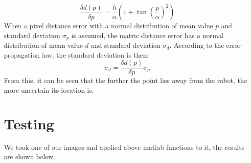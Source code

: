 \documentclass[12pt]{article}
\begin{document}
\begin{equation}
\frac{\delta d(p)}{\delta p} = \frac{h}{\alpha} (1+\tan{(\frac{p}{\alpha})}^2)
\end{equation}
When a pixel distance error with a normal distribution of mean value $p$ and standard deviation $\sigma_p$ is assumed, the matric distance error has a normal distribution of mean value $d$ and standard deviation $\sigma_d$. According to the error propagation law, the standard deviation is then:
\begin{equation}
\sigma_d = \frac{\delta d(p)}{\delta p} \sigma_p
\end{equation}
From this, it can be seen that the further the point lies away from the robot, the more uncertain its location is.
\clearpage
\section{Testing}
We took one of our images and applied above matlab functions to it, the results are shown below.
\end{document}
